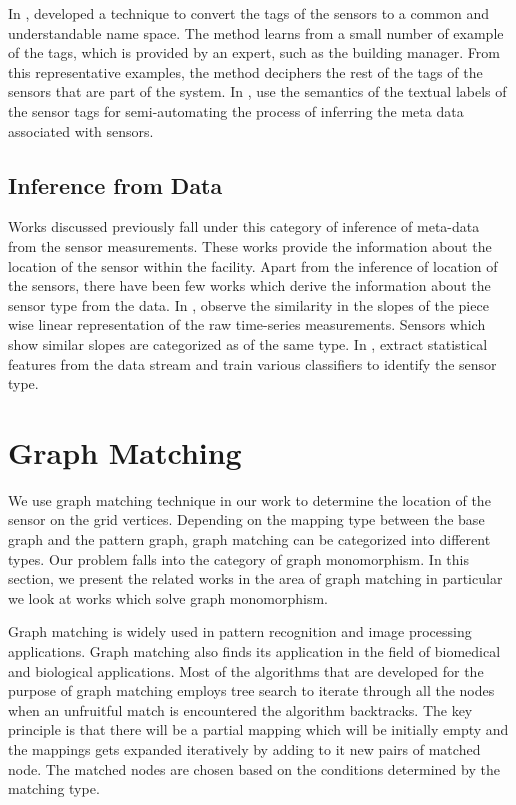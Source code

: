 In \cite{bhattacharya2014enabling}, \citeauthor{bhattacharya2014enabling} developed a technique to convert the tags of the sensors to a common and understandable name space. The method learns from a small number of example of the tags, which is provided by an expert, such as the building manager. From this representative examples, the method deciphers the rest of the tags of the sensors that are part of the system.
In \cite{Schumann:2014:TAD:2674061.2674081}, \citeauthor{Schumann:2014:TAD:2674061.2674081} use the semantics of the textual labels of the sensor tags for semi-automating the process of inferring the meta data associated with sensors.
\subsection{Inference from Data}
Works \cite{Hong:2013:TAS:2528282.2528302,doi:10.1061/9780784413616.226,Koc:2014:CLC:2674061.2674075,Lu:2014:SBS:2648771.2629441,ellis2012creating,muller2014automated,marinakis2005learning} discussed previously fall under this category of inference of meta-data from the sensor measurements. These works provide the information about the location of the sensor within the facility. 
Apart from the inference of location of the sensors, there have been few works which derive the information about the sensor type from the data. In \cite{calbimonte2012deriving}, \citeauthor{calbimonte2012deriving} observe the similarity in the slopes of the piece wise linear representation of the raw time-series measurements. Sensors which show similar slopes are categorized as of the same type. In \cite{gao2015data}, \citeauthor{gao2015data} extract statistical features from the data stream and train various classifiers to identify the sensor type.
\section{Graph Matching}
\label{sec:graphLitReview}
We use graph matching technique in our work to determine the location of the sensor on the grid vertices. Depending on the mapping type between the base graph and the pattern graph, graph matching can be categorized into different types. Our problem falls into the category of graph monomorphism. In this section, we present the related works in the area of graph matching in particular we look at works which solve graph monomorphism.

Graph matching is widely used in pattern recognition and image processing applications. Graph matching also finds its application in the field of biomedical and biological applications. 
Most of the algorithms that are developed for the purpose of graph matching employs tree search to iterate through all the nodes when an unfruitful match is encountered the algorithm backtracks.
The key principle is that there will be a partial mapping which will be initially empty and the mappings gets expanded iteratively by adding to it new pairs of matched node. The matched nodes are chosen based on the conditions determined by the matching type.

